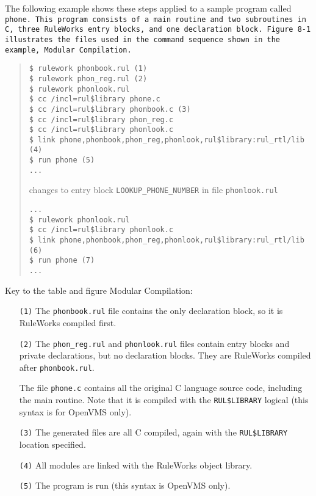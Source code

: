 The following example shows these steps applied to a sample program
called \tt{phone}. This program consists of a main routine and two
subroutines in C, three RuleWorks entry blocks, and one declaration
block. Figure 8-1 illustrates the files used in the command sequence
shown in the example, Modular Compilation.

\begin{quote}
\begin{verbatim}
$ rulework phonbook.rul (1)
$ rulework phon_reg.rul (2)
$ rulework phonlook.rul
$ cc /incl=rul$library phone.c
$ cc /incl=rul$library phonbook.c (3)
$ cc /incl=rul$library phon_reg.c
$ cc /incl=rul$library phonlook.c
$ link phone,phonbook,phon_reg,phonlook,rul$library:rul_rtl/lib (4)
$ run phone (5)
...
\end{verbatim}

changes to entry block \verb|LOOKUP_PHONE_NUMBER| in file
\verb|phonlook.rul|

\begin{verbatim}
...
$ rulework phonlook.rul
$ cc /incl=rul$library phonlook.c
$ link phone,phonbook,phon_reg,phonlook,rul$library:rul_rtl/lib (6)
$ run phone (7)
...
\end{verbatim}
\end{quote}
Key to the table and figure Modular Compilation:
\begin{itemize}
\item[\tt{(1)}] The \verb|phonbook.rul| file contains the only
  declaration block, so it is RuleWorks compiled first.

\item[\tt{(2)}] The \verb|phon_reg.rul| and \verb|phonlook.rul| files
  contain entry blocks and private declarations, but no declaration
  blocks. They are RuleWorks compiled after \verb|phonbook.rul|.

  The file \verb|phone.c| contains all the original C language source
  code, including the main routine. Note that it is compiled with the
  \verb|RUL$LIBRARY| logical (this syntax is for OpenVMS only).

\item[\tt{(3)}] The generated files are all C compiled, again with the
  \verb|RUL$LIBRARY| location specified.

\item[\tt{(4)}] All modules are linked with the RuleWorks object
  library.

\item[\tt{(5)}] The program is run (this syntax is OpenVMS only).
\end{itemize}

